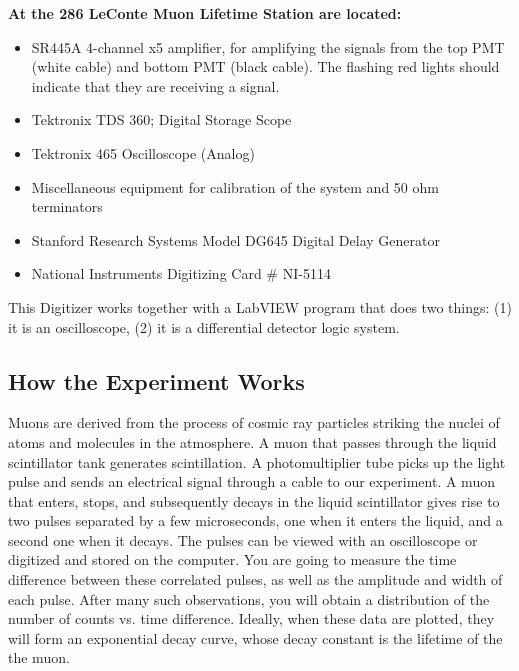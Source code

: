 \documentclass{../lab}
\begin{document}
\noindent\textbf{At the 286 LeConte Muon Lifetime Station are located:}

\begin{itemize}
    \item SR445A 4-channel x5 amplifier, for amplifying the signals from the top PMT (white cable) and bottom PMT (black cable). The flashing red lights should indicate that they are receiving a signal.

    \item Tektronix TDS 360; Digital Storage Scope

    \item Tektronix 465 Oscilloscope (Analog)

    \item Miscellaneous equipment for calibration of the system and 50 ohm terminators

    \item Stanford Research Systems Model DG645 Digital Delay Generator

    \item National Instruments Digitizing Card \# NI-5114

\end{itemize}

\noindent This Digitizer works together with a LabVIEW program that does two things: (1) it is an oscilloscope, (2) it is a differential detector logic system.

\subsection{How the Experiment Works}

\newpage

Muons are derived from the process of cosmic ray particles striking the nuclei of atoms and molecules in the atmosphere. A muon that passes through the liquid scintillator tank generates scintillation. A photomultiplier tube picks up the light pulse and sends an electrical signal through a cable to our experiment. A muon that enters, stops, and subsequently decays in the liquid scintillator gives rise to two pulses separated by a few microseconds, one when it enters the liquid, and a second one when it decays. The pulses can be viewed with an oscilloscope or digitized and stored on the computer. You are going to measure the time difference between these correlated pulses, as well as the amplitude and width of each pulse. After many such observations, you will obtain a distribution of the number of counts vs. time difference. Ideally, when these data are plotted, they will form an exponential decay curve, whose decay constant is the lifetime of the the muon.
\end{document}
